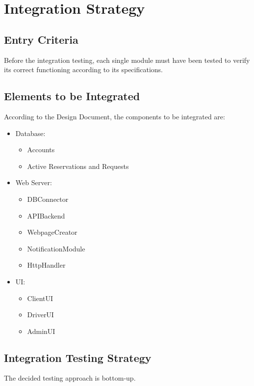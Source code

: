 \documentclass{article}
\begin{document}
\section{Integration Strategy}
\subsection{Entry Criteria}
Before the integration testing, each single module must have been tested to verify its correct functioning according to its specifications.
\subsection{Elements to be Integrated}
According to the Design Document, the components to be integrated are:
\begin{itemize}
	\item Database: 
	\begin{itemize}
		\item Accounts
		\item Active Reservations and Requests
	\end{itemize}
	\item Web Server: 
	\begin{itemize}
		\item DBConnector
		\item APIBackend
		\item WebpageCreator
		\item NotificationModule
		\item HttpHandler
	\end{itemize}
	\item UI:\@
	\begin{itemize}
		\item ClientUI
		\item DriverUI
		\item AdminUI
	\end{itemize}
\end{itemize}
\subsection{Integration Testing Strategy}
The decided testing approach is bottom-up. %
\end{document}
